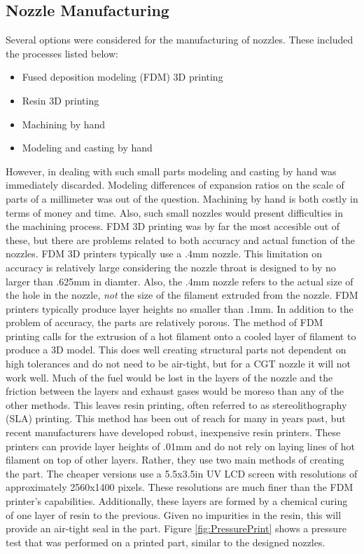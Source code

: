 \subsection{Nozzle Manufacturing}
Several options were considered for the manufacturing of nozzles. These included the processes listed below:
\begin{itemize}
\item Fused deposition modeling (FDM) 3D printing
\item Resin 3D printing
\item Machining by hand
\item Modeling and casting by hand
\end{itemize}
However, in dealing with such small parts modeling and casting by hand was immediately discarded. Modeling differences of expansion ratios on the scale of parts of a millimeter was out of the question. Machining by hand is both costly in terms of money and time. Also, such small nozzles would present difficulties in the machining process. FDM 3D printing was by far the most accesible out of these, but there are problems related to both accuracy and actual function of the nozzles. FDM 3D printers typically use a .4mm nozzle. This limitation on accuracy is relatively large considering the nozzle throat is designed to by no larger than .625mm in diamter. Also, the .4mm nozzle refers to the actual size of the hole in the nozzle, \textit{not} the size of the filament extruded from the nozzle. FDM printers typically produce layer heights no smaller than .1mm. In addition to the problem of accuracy, the parts are relatively porous. The method of FDM printing calls for the extrusion of a hot filament onto a cooled layer of filament to produce a 3D model. This does well creating structural parts not dependent on high tolerances and do not need to be air-tight, but for a CGT nozzle it will not work well. Much of the fuel would be lost in the layers of the nozzle and the friction between the layers and exhaust gases would be moreso than any of the other methods. This leaves resin printing, often referred to as stereolithography (SLA) printing. This method has been out of reach for many in years past, but recent manufacturers have developed robust, inexpensive resin printers. These printers can provide layer heights of .01mm and do not rely on laying lines of hot filament on top of other layers. Rather, they use two main methods of creating the part. The cheaper versions use a 5.5x3.5in UV LCD screen with resolutions of approximately 2560x1400 pixels. These resolutions are much finer than the FDM printer's capabilities. Additionally, these layers are formed by a chemical curing of one layer of resin to the previous. Given no impurities in the resin, this will provide an air-tight seal in the part. Figure \ref{fig:PressurePrint} shows a pressure test that was performed on a printed part, similar to the designed nozzles.
